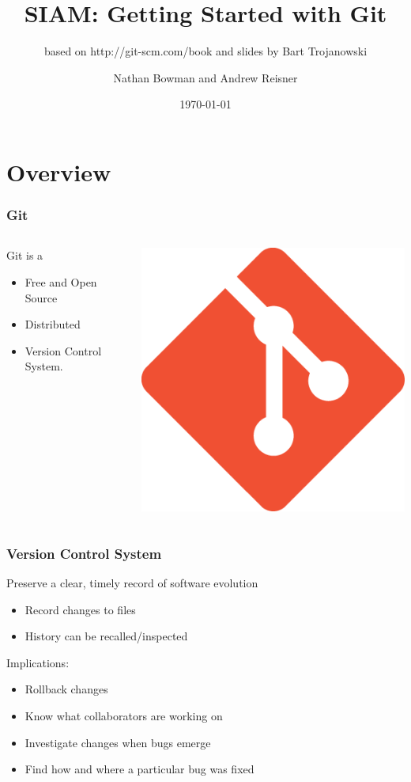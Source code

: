 \documentclass[english,compress]{beamer}
\title{SIAM: Getting Started with Git}
\subtitle{based on http://git-scm.com/book and slides by Bart Trojanowski}
\author{Nathan Bowman and Andrew Reisner}
\date{\today}
\begin{document}
\nocite{*}
\frame{\titlepage}

\section{Overview}
\frame
{
    \frametitle{Git}
    \begin{columns}
    \begin{column}{.5\textwidth}
        Git is a
        \begin{itemize}
            \item Free and Open Source
            \item Distributed
            \item Version Control System.
        \end{itemize}
    \end{column}
    \begin{column}{.5\textwidth}
        \begin{center}
            \includegraphics[width=.7\textwidth]{figs/git-logo.png}
        \end{center}
    \end{column}
    \end{columns}
}

\frame
{
    \frametitle{Version Control System}

        Preserve a clear, timely record of software evolution
            \begin{itemize}
                \item Record changes to files
                \item History can be recalled/inspected
            \end{itemize}
        Implications:
            \begin{itemize}
                \item Rollback changes
                \item Know what collaborators are working on
                \item Investigate changes when bugs emerge
                \item Find how and where a particular bug was fixed
            \end{itemize}
}
\end{document}

